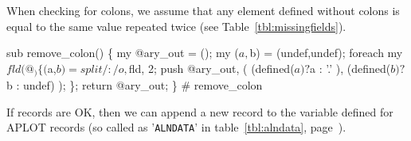 \documentclass[11pt]{article}
\def\nwendcode{\endtrivlist \endgroup} %
\begin{document}
When checking for colons, we assume that any element defined without colons is equal to the same value repeated twice (see Table~\ref{tbl:missingfields}). 

\nwenddocs{}\plusendmoddef
sub remove_colon() \{
    my @ary_out = ();
    my ($a,$b) = (undef,undef);
    foreach my $fld (@_) \{
        ($a,$b) = split /:/o, $fld, 2;
        push @ary_out, (
            (defined($a) ? $a : '.'  ),
            (defined($b) ? $b : undef)
            );
    \};
    return @ary_out;
\} # remove_colon
\eatline
{}\nwendcode{}%


If records are OK, then we can append a new record to the variable defined for APLOT records (so called as '{\tt{}{}ALN{}DATA}' in table~\ref{tbl:alndata}, page~\pageref{tbl:alndata}). \label{sec:APLOThsh}
\end{document}
